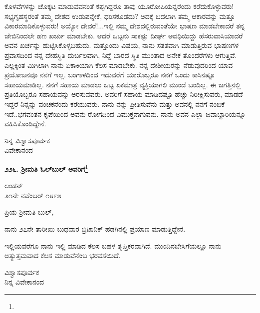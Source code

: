 \vspace{0.1cm}

ಕೊಳವೆಗಳನ್ನು ಚೊಕ್ಕಟ ಮಾಡುವವನಂತೆ ಕಪ್ಪಗಿದ್ದರೂ ತಾವು ಯೂರೋಪಿಯನ್ನರೆಂದು ಕರೆದುಕೊಳ್ಳುವರು! ಸಭ್ಯಗೃಹಸ್ಥರಂತೆ ತಮ್ಮ ದೇಶದ ಉಡುಪನ್ನೇಕೆ, ಧರಿಸಕೂಡದು? ಅದಕ್ಕೆ ಬದಲಾಗಿ ತಮ್ಮ ಆಕಾರವನ್ನು ಮತ್ತೂ ವಿಕಾರಮಾಡಿಕೊಳ್ಳುವರು! ಅಯ್ಯೋ ದೇವರೆ!...ಇಲ್ಲಿ ನಮ್ಮ ದೇಶದಲ್ಲಿರುವಂತೆಯೇ ಭಾಷಣ ಮಾಡಬೇಕಾದರೆ ತನ್ನ ಜೇಬಿನಿಂದಲೇ ಹಣ ಖರ್ಚು ಮಾಡಬೇಕು. ಆದರೆ ಒಬ್ಬನು ಸಾಕಷ್ಟು ದೀರ್ಘ ಅವಧಿಯಿದ್ದು ಹೆಸರುವಾಸಿಯಾದರೆ ಅವನ ಖರ್ಚನ್ನು ಹುಟ್ಟಿಸಿಕೊಳ್ಳಬಹುದು. ಮತ್ತೊಂದು ವಿಷಯ, ನಾನು ಸತತವಾಗಿ ಮಾಡುತ್ತಿರುವ ಭಾಷಣಗಳ ಪ್ರವಾಸದಿಂದ ನನ್ನ ದೇಹಸ್ಥಿತಿ ದುರ್ಬಲವಾಗಿ, ನಿದ್ದೆ ಬಾರದ ಸ್ಥಿತಿ ಮುಂತಾದ ಅನೇಕ ತೊಂದರೆಗಳು ಆಗುತ್ತಿವೆ. ಎಲ್ಲಕ್ಕಿಂತ ಮಿಗಿಲಾಗಿ ನಾನು ಏಕಾಕಿಯಾಗಿ ಕೆಲಸ ಮಾಡಬೇಕು. ನನ್ನ ದೇಶೀಯರನ್ನು ನೆಡುವುದರಿಂದ ಯಾವ ಪ್ರಯೋಜನವೂ ನನಗೆ ಇಲ್ಲ. ಬಂಗಾಳದಿಂದ ಇದುವರೆಗೆ ಯಾರೊಬ್ಬರೂ ನನಗೆ ಒಂದು ಕಾಸಿನಷ್ಟೂ ಸಹಾಯಮಾಡಿಲ್ಲ. ನನಗೆ ಸಹಾಯ ಮಾಡಲು ಒಬ್ಬ ಏಕಮಾತ್ರ ವ್ಯಕ್ತಿಯಾಗಲಿ ಮುಂದೆ ಬಂದಿಲ್ಲ. ಈ ಜಗತ್ತಿನಲ್ಲಿ ಪ್ರತಿಯೊಬ್ಬರೂ ಸಹಾಯವನ್ನು ಅರಸುವವರು. ಅವರಿಗೆ ಸಹಾಯ ಮಾಡಿದಷ್ಟೂ ಹೆಚ್ಚು ನಿರೀಕ್ಷಿಸುವರು, ಮಾಡದೆ ಇದ್ದರೆ ನಿನ್ನನ್ನು ವಂಚಕನೆಂದು ಕರೆಯುವರು. ನಾನು\enginline{-} ನನ್ನು ಪ್ರೀತಿಸುವೆನು ಮತ್ತು ಅವನಲ್ಲಿ ನನಗೆ ನಂಬಿಕೆ ಇದೆ..ಭಗವಂತನ ಕೃಪೆಯಿಂದ ಅವನು ರೋಗದಿಂದ ವಿಮುಕ್ತನಾಗುವನು. ನಾನು ಅವನ ಎಲ್ಲಾ ಜವಾಬ್ದಾರಿಯನ್ನೂ ವಹಿಸಿಕೊಂಡಿದ್ದೇನೆ.

\vspace{-0.45cm}

{\flushright
ನಿನ್ನ ವಿಶ್ವಾಸಪೂರ್ವಕ\\ವಿವೇಕಾನಂದ\par}


\begin{center}
\textbf{೨೨೬. ಶ‍್ರೀಮತಿ ಓಲ್‌ಬುಲ್‌ ಅವರಿಗೆ}\footnote{}
\end{center}

\vspace{-0.55cm}

\begin{flushright}
ಲಂಡನ್\\೨೧ನೇ ನವೆಂಬರ್ ೧೮೯೫
\end{flushright}

\vspace{-0.45cm}

\noindent
ಪ್ರಿಯ ಶ‍್ರೀಮತಿ ಬುಲ್,

ನಾನು ೨೭ನೇ ತಾರೀಖು ಬುಧವಾರ ಬ್ರಿಟಾನಿಕ್ ಹಡಗಿನಲ್ಲಿ ಪ್ರಯಾಣ ಮಾಡುತ್ತಿದ್ದೇನೆ.

\newpage

\noindent
 ಇಲ್ಲಿಯವರೆಗೂ ನಾನು ಇಲ್ಲಿ ಮಾಡಿದ ಕೆಲಸ ಬಹಳ ತೃಪ್ತಿಕರವಾಗಿದೆ. ಮುಂದಿನ\break ಬೇಸಿಗೆಯಲ್ಲೂ ನಾನು ಅತ್ಯುತ್ತಮವಾದ ಕೆಲಸ ಮಾಡುವೆನೆಂಬ ಭರವಸೆಯಿದೆ.

{\flushright
ವಿಶ್ವಾಸಪೂರ್ವಕ\\ನಿನ್ನ ವಿವೇಕಾನಂದ\par}

